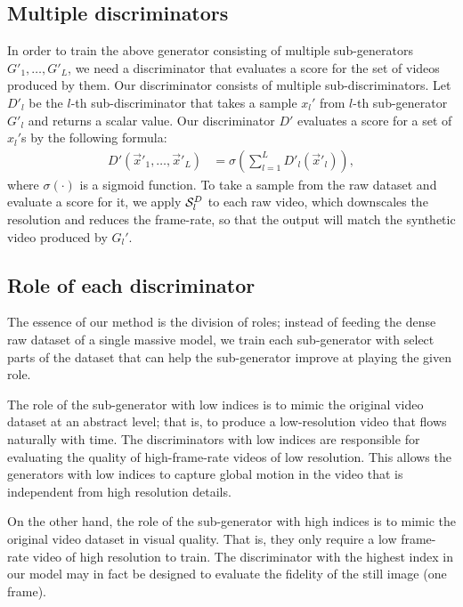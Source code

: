 \documentclass[twocolumn]{svjour3}
\begin{document}
\subsection{Multiple discriminators}



In order to train the above generator consisting of multiple sub-generators $G'_1, \dots, G'_L$, we need a discriminator that evaluates a score for the set of videos produced by them.
Our discriminator consists of multiple sub-discriminators.
Let $D'_l$ be the $l$-th sub-discriminator that takes a sample $x_l'$  from $l$-th sub-generator $G'_l$ and returns a scalar value.
Our discriminator $D'$ evaluates a score for a set of $x_l'$s by the following formula:
\vspace{-1truemm}
\begin{align}
    D'(\vec{x}'_1, \dots, \vec{x}'_L) &= \sigma \left( \sum_{l=1}^L D'_l(\vec{x}'_l) \right),
\end{align}
where $\sigma(\cdot)$ is a sigmoid function.
To take a sample from the raw dataset and evaluate a score for it, we apply ${\cal S}^D_l$ to each raw video, which downscales the resolution and reduces the frame-rate, so that the output will match the synthetic video produced by $G_l'$.




\subsection{Role of each discriminator}

The essence of our method is the division of roles;
instead of feeding the dense raw dataset of a single massive model,
we train each sub-generator with select parts of the dataset that can help the sub-generator improve at playing the given role.


The role of the sub-generator with low indices is to mimic the original video dataset at an abstract level; that is, to produce a low-resolution video that flows naturally with time.
The discriminators with low indices are responsible for evaluating the quality of high-frame-rate videos of low resolution.
This allows the generators with low indices to capture global motion in the video that is independent from high resolution details.



On the other hand, the role of the sub-generator with high indices is to mimic the original video dataset in visual quality.
That is, they only require a low frame-rate video of high resolution to train.
The discriminator with the highest index in our model may in fact be designed to evaluate the fidelity of the still image (one frame).
\end{document}
